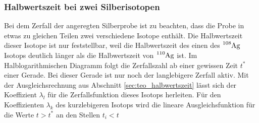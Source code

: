 \subsubsection{Halbwertszeit bei zwei Silberisotopen}
Bei dem Zerfall der angeregten Silberprobe ist zu beachten, dass die Probe in etwas zu 
gleichen Teilen zwei verschiedene Isotope enthält.
Die Halbwertszeit dieser Isotope ist nur feststellbar, weil die Halbwertszeit des einen
des $\ce{^{108}Ag}$ Isotops deutlich länger als die Halbwertszeit von $\ce{^{110}Ag}$ ist.
Im Halblogarithmischen Diagramm folgt die Zerfallszahl ab einer gewissen Zeit $t^{*}$ einer Gerade.
Bei dieser Gerade ist nur noch der langlebigere Zerfall aktiv.
Mit der Ausgleichsrechnung aus Abschnitt \ref{sec:teo_halbwertszeit} 
lässt sich der Koeffizient $\lambda_{l}$ für die Zerfallsfunktion dieses Isotops herleiten.
Für den Koeffizienten $\lambda_{k}$ des kurzlebigeren Isotops
wird die lineare Ausgleichsfunktion für die Werte $t > t^*$ an den Stellen $t_i < t$

